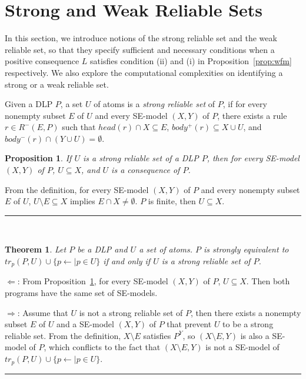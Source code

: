 \documentclass{article}
\newtheorem{theorem}{Theorem}
\newtheorem{proposition}{Proposition}
\newtheorem{corollary}[theorem]{Corollary}
\newenvironment{proofs}{{\bf Proof Sketch:}}{\rule{2mm}{2mm}\\[-.5em] }
\newcommand{\trp}{tr_p}
\begin{document}
\section{Strong and Weak Reliable Sets}

In this section, we introduce notions of the strong reliable set and the weak reliable set, so that they specify sufficient and necessary conditions when a positive consequence $L$ satisfies condition (ii) and (i) in Proposition~\ref{prop:wfm} respectively.
We also explore the computational complexities on identifying a strong or a weak reliable set.


Given a DLP $P$, a set $U$ of atoms is a {\em strong reliable set} of $P$, if for every nonempty subset $E$ of $U$ and every SE-model $(X, Y)$ of $P$, there exists a rule $r\in R^-(E, P)$ such that $head(r)\cap X \subseteq E$, $body^+(r) \subseteq X\cup U$, and $body^-(r)\cap (Y\cup U) =\emptyset$.

\begin{proposition}\label{prop:s1}
  If $U$ is a strong reliable set of a DLP $P$, then for every SE-model $(X, Y)$ of $P$, $U\subseteq X$, and $U$ is a consequence of $P$.
\end{proposition}
\begin{proofs}
  From the definition, for every SE-model $(X, Y)$ of $P$ and every nonempty subset $E$ of $U$, $U\setminus E \subseteq X$ implies $E\cap X \neq\emptyset$. $P$ is finite, then $U\subseteq X$.
\end{proofs}



\begin{theorem}\label{them:s}
  Let $P$ be a DLP and $U$ a set of atoms. $P$ is strongly equivalent to $\trp(P, U) \cup \{p\gets \mid p\in U\}$ if and only if $U$ is a strong reliable set of $P$.
\end{theorem}
\begin{proofs}
  $\Leftarrow$: From Proposition~\ref{prop:s1}, for every SE-model $(X, Y)$ of $P$, $U\subseteq X$. Then both programs have the same set of SE-models.

  $\Rightarrow$: Assume that $U$ is not a strong reliable set of $P$, then there exists a nonempty subset $E$ of $U$ and a SE-model $(X, Y)$ of $P$ that prevent $U$ to be a strong reliable set. From the definition, $X\setminus E$ satisfies $P^Y$, so $(X\setminus E, Y)$ is also a SE-model of $P$, which conflicts to the fact that $(X\setminus E, Y)$ is not a SE-model of $\trp(P, U) \cup \{p\gets \mid p\in U\}$.
\end{proofs}
\end{document}
